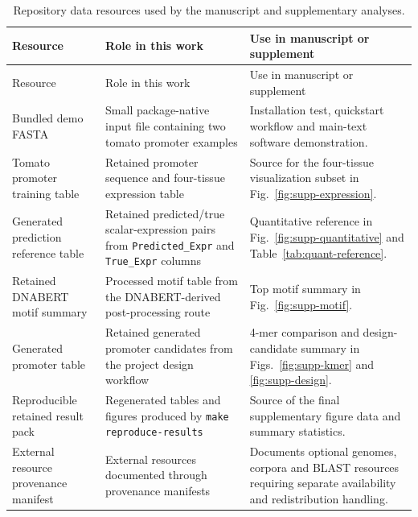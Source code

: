 \documentclass[10pt]{article}
\begin{document}
\begin{longtable}{L{0.22\textwidth}L{0.28\textwidth}L{0.39\textwidth}}
\caption{Repository data resources used by the manuscript and supplementary analyses.}\label{tab:data-resources}\\
\toprule
Resource & Role in this work & Use in manuscript or supplement \\
\midrule
\endfirsthead
\toprule
Resource & Role in this work & Use in manuscript or supplement \\
\midrule
\endhead
Bundled demo FASTA & Small package-native input file containing two tomato promoter examples & Installation test, quickstart workflow and main-text software demonstration. \\
Tomato promoter training table & Retained promoter sequence and four-tissue expression table & Source for the four-tissue visualization subset in Fig.~\ref{fig:supp-expression}. \\
Generated prediction reference table & Retained predicted/true scalar-expression pairs from \texttt{Predicted\_Expr} and \texttt{True\_Expr} columns & Quantitative reference in Fig.~\ref{fig:supp-quantitative} and Table~\ref{tab:quant-reference}. \\
Retained DNABERT motif summary & Processed motif table from the DNABERT-derived post-processing route & Top motif summary in Fig.~\ref{fig:supp-motif}. \\
Generated promoter table & Retained generated promoter candidates from the project design workflow & 4-mer comparison and design-candidate summary in Figs.~\ref{fig:supp-kmer} and \ref{fig:supp-design}. \\
Reproducible retained result pack & Regenerated tables and figures produced by \texttt{make reproduce-results} & Source of the final supplementary figure data and summary statistics. \\
External resource provenance manifest & External resources documented through provenance manifests & Documents optional genomes, corpora and BLAST resources requiring separate availability and redistribution handling. \\
\bottomrule
\end{longtable}
\end{document}
